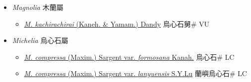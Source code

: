 
  \begin{itemize}
 \item[] \textit{Magnolia} 木蘭屬
                    
  \begin{itemize}
        \item[] \href{http://www.theplantlist.org/tpl1.1/search?q=Magnolia+kachirachirai}{\textit{M. kachirachirai} (Kaneh. \& Yamam.) Dandy}   烏心石舅\# VU
  \end{itemize}
 \item[] \textit{Michelia} 烏心石屬
                    
  \begin{itemize}
        \item[] \href{http://www.theplantlist.org/tpl1.1/search?q=Michelia+compressa+var.+formosana}{\textit{M. compressa} (Maxim.) Sargent var. \textit{formosana} Kanah.}   烏心石\# LC
        \item[] \href{http://www.theplantlist.org/tpl1.1/search?q=Michelia+compressa+var.+lanyuensis}{\textit{M. compressa} (Maxim.) Sargent var. \textit{lanyuensis} S.Y.Lu}   蘭嶼烏心石\# LC
  \end{itemize}
  \end{itemize}

